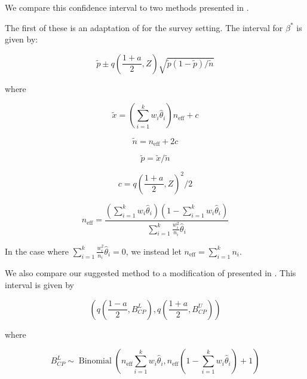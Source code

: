 \documentclass[AMA,STIX1COL]{WileyNJD-v2}
\begin{document}
We compare this confidence interval to two methods presented in \cite{Dean:2015}.

The first of these is an adaptation of \cite{AgrestiCoull} for the survey setting.
The interval for \( \beta^* \) is given by:

\begin{equation}
    \tilde{p} \pm q\left( \frac{1 + a}{2}, Z \right) \sqrt{\tilde{p}(1 - \tilde{p}) / \tilde{n}}
\end{equation}

where 

\begin{equation}
   \tilde{x} = \left( \sum_{i=1}^k w_i \hat{\theta}_i \right) n_{\text{eff}} + c 
\end{equation}

\begin{equation}
   \tilde{n} = n_{\text{eff}} + 2c 
\end{equation}

\begin{equation}
    \tilde{p} = \tilde{x} / \tilde{n}
\end{equation}

\begin{equation}
   c = q\left( \frac{1 + a}{2}, Z \right)^2/2 
\end{equation}

\begin{equation}
   n_{\text{eff}} = \frac{\left( \sum_{i=1}^k w_i \hat{\theta}_i \right) \left(1 - \sum_{i=1}^k w_i \hat{\theta}_i \right)}{\sum_{i=1}^k \frac{w_i^2}{n_i}\hat{\theta}_i} 
   \label{eq:neff}
\end{equation}
 
In the case where \( \sum_{i=1}^k \frac{w_i^2}{n_i}\hat{\theta}_i = 0 \), we instead let \( n_{\text{eff}} = \sum_{i=1}^k n_i \).

We also compare our suggested method to a modification of \cite{Korn:1998} presented in \cite{Dean:2015}.
This interval is given by 

\begin{equation}
    \left( q \left( \frac{1 - a}{2}, B^L_{CP} \right), q \left( \frac{1 + a}{2}, B^U_{CP} \right)  \right)
\end{equation}

where 

\begin{equation}
    B^L_{CP} \sim \operatorname{Binomial}\left(n_{\text{eff}} \sum_{i=1}^k w_i \hat{\theta}_i, n_{\text{eff}} \left(1 -  \sum_{i=1}^k w_i \hat{\theta}_i\right) + 1\right)
\end{equation}
\end{document}
